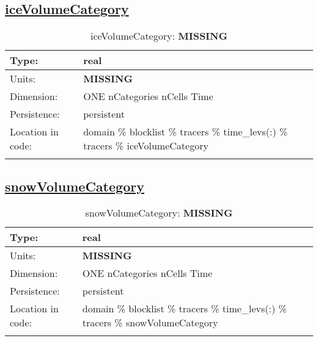 \subsection[iceVolumeCategory]{\hyperref[sec:var_tab_tracers]{iceVolumeCategory}}
\label{subsec:var_sec_tracers_iceVolumeCategory}
\begin{center}
\begin{longtable}{| p{2.0in} | p{4.0in} |}
        \hline 
        Type: & real \\
        \hline 
        Units: & {\bf \color{red} MISSING} \\
        \hline 
        Dimension: & ONE nCategories nCells Time \\
        \hline 
        Persistence: & persistent \\
        \hline 
         Location in code: & domain \% blocklist \% tracers \% time\_levs(:) \% tracers \% iceVolumeCategory \\
         \hline 
    \caption{iceVolumeCategory: {\bf \color{red} MISSING}}
\end{longtable}
\end{center}
\subsection[snowVolumeCategory]{\hyperref[sec:var_tab_tracers]{snowVolumeCategory}}
\label{subsec:var_sec_tracers_snowVolumeCategory}
\begin{center}
\begin{longtable}{| p{2.0in} | p{4.0in} |}
        \hline 
        Type: & real \\
        \hline 
        Units: & {\bf \color{red} MISSING} \\
        \hline 
        Dimension: & ONE nCategories nCells Time \\
        \hline 
        Persistence: & persistent \\
        \hline 
         Location in code: & domain \% blocklist \% tracers \% time\_levs(:) \% tracers \% snowVolumeCategory \\
         \hline 
    \caption{snowVolumeCategory: {\bf \color{red} MISSING}}
\end{longtable}
\end{center}
